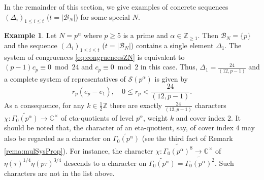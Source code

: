 \documentclass[12pt]{amsart}
\numberwithin{equation}{section}
\theoremstyle{plain}
\theoremstyle{definition}
\newtheorem{examp}[thm]{Example}
\theoremstyle{remark}
\newcommand*\abs[1]{\lvert#1\rvert}
\newcommand\numZ{\mathbb{Z}}
\newcommand\numC{\mathbb{C}}
\newcommand\numgeq[2]{\mathbb{#1}_{\geq #2}}
\newcommand\Dcover[2]{\widetilde{#1^{#2}}}
\begin{document}
In the remainder of this section, we give examples of concrete sequences $(\Delta_i)_{1\leq i\leq t}$ ($t=\abs{\mathscr{B}_N}$) for some special $N$.
\begin{examp}
\label{examp:classifyChar1}
Let $N=p^\alpha$ where $p\geq 5$ is a prime and $\alpha\in\numgeq{Z}{1}$. Then $\mathscr{B}_N=\{p\}$ and the sequence $(\Delta_i)_{1\leq i\leq t}$ ($t=\abs{\mathscr{B}_N}$) contains a single element $\Delta_1$. The system of congruences \eqref{eq:congruencesZN} is equivalent to $(p-1)c_p\equiv0\bmod{24}$ and $c_p\equiv0\bmod{2}$ in this case. Thus, $\Delta_1=\frac{24}{(12,p-1)}$ and a complete system of representatives of $\mathscr{S}(p^\alpha)$ is given by
\begin{equation*}
r_{p}(e_{p}-e_1),\quad 0\leq r_{p}<\frac{24}{(12,p-1)}.
\end{equation*}
As a consequence, for any $k\in\frac{1}{2}\numZ$ there are exactly $\frac{24}{(12,p-1)}$ characters $\chi\colon\widetilde{\Gamma_0(p^\alpha)}\to\numC^\times$ of eta-quotients of level $p^\alpha$, weight $k$ and cover index $2$. It should be noted that, the character of an eta-quotient, say, of cover index $4$ may also be regarded as a character on $\widetilde{\Gamma_0(p^\alpha)}$ (see the third fact of Remark \ref{rema:mulSysProp}). For instance, the character $\chi\colon\Dcover{\Gamma_0(p^\alpha)}{8}\to\numC^\times$ of $\eta(\tau)^{1/4}\eta(p\tau)^{3/4}$ descends to a character on $\widetilde{\Gamma_0(p^\alpha)}=\Dcover{\Gamma_0(p^\alpha)}{2}$. Such characters are not in the list above.
\end{examp}
\end{document}
